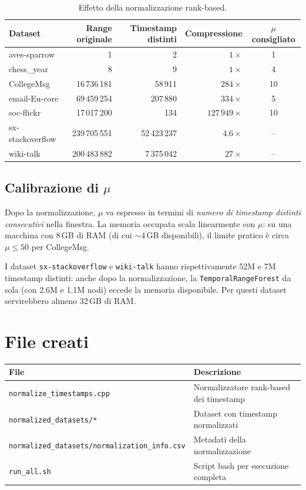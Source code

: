 \documentclass[a4paper,11pt]{article}
\begin{document}
\begin{table}[h]
\centering
\begin{tabular}{lrrrc}
\toprule
\textbf{Dataset} & \textbf{Range originale} & \textbf{Timestamp distinti} & \textbf{Compressione} & \textbf{$\mu$ consigliato} \\
\midrule
aves-sparrow     & 1            & 2         & $1\times$        & 1  \\
chess\_year      & 8            & 9         & $1\times$        & 4  \\
CollegeMsg       & 16\,736\,181  & 58\,911    & $284\times$      & 10 \\
email-Eu-core    & 69\,459\,254  & 207\,880   & $334\times$      & 5  \\
soc-flickr       & 17\,017\,200  & 134        & $127\,949\times$ & 10 \\
sx-stackoverflow & 239\,705\,551 & 52\,423\,237 & $4.6\times$    & -- \\
wiki-talk        & 200\,483\,882 & 7\,375\,042  & $27\times$     & -- \\
\bottomrule
\end{tabular}
\caption{Effetto della normalizzazione rank-based.}
\end{table}

\subsection{Calibrazione di $\mu$}

Dopo la normalizzazione, $\mu$ va espresso in termini di \emph{numero di timestamp distinti consecutivi} nella finestra. La memoria occupata scala linearmente con $\mu$: su una macchina con 8\,GB di RAM (di cui $\sim$4\,GB disponibili), il limite pratico \`e circa $\mu \leq 50$ per CollegeMsg.

I dataset \texttt{sx-stackoverflow} e \texttt{wiki-talk} hanno rispettivamente 52M e 7M timestamp distinti: anche dopo la normalizzazione, la \texttt{TemporalRangeForest} da sola (con 2.6M e 1.1M nodi) eccede la memoria disponibile. Per questi dataset servirebbero almeno 32\,GB di RAM.

\section{File creati}

\begin{table}[h]
\centering
\begin{tabular}{ll}
\toprule
\textbf{File} & \textbf{Descrizione} \\
\midrule
\texttt{normalize\_timestamps.cpp} & Normalizzatore rank-based dei timestamp \\
\texttt{normalized\_datasets/*}    & Dataset con timestamp normalizzati \\
\texttt{normalized\_datasets/normalization\_info.csv} & Metadati della normalizzazione \\
\texttt{run\_all.sh}               & Script bash per esecuzione completa \\
\bottomrule
\end{tabular}
\end{table}
\end{document}
